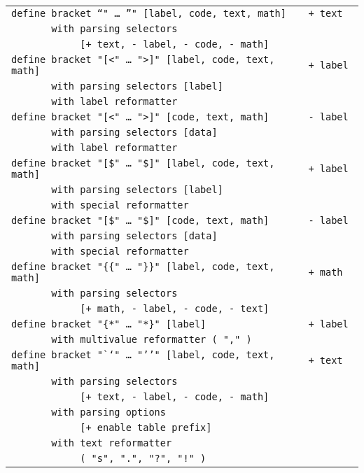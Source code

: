 \documentclass[12pt]{article}
\begin{document}
\begin{center}
\begin{tabular}{l@{\hspace*{0.2in}}l}
\tt define bracket "`" \ldots~"'" [label, code, text, math]
						              & \tt + text \\
\tt ~~~~~~~with parsing selectors \\
\tt ~~~~~~~~~~~~[+ text, - label, - code, - math] \\
\tt define bracket "[<" \ldots~">]" [label, code, text, math] & \tt + label \\
\tt ~~~~~~~with parsing selectors [label] \\
\tt ~~~~~~~with label reformatter \\
\tt define bracket "[<" \ldots~">]" [code, text, math]	      & \tt - label \\
\tt ~~~~~~~with parsing selectors [data] \\
\tt ~~~~~~~with label reformatter \\
\tt define bracket "[\$" \ldots~"\$]" [label, code, text, math]
                                                              & \tt + label \\
\tt ~~~~~~~with parsing selectors [label] \\
\tt ~~~~~~~with special reformatter \\
\tt define bracket "[\$" \ldots~"\$]" [code, text, math]
                                                              & \tt - label \\
\tt ~~~~~~~with parsing selectors [data] \\
\tt ~~~~~~~with special reformatter \\
\tt define bracket "\{\{" \ldots~"\}\}" [label, code, text, math]
                                                              & \tt + math \\
\tt ~~~~~~~with parsing selectors \\
\tt ~~~~~~~~~~~~[+ math, - label, - code, - text] \\
\tt define bracket "\{*" \ldots~"*\}" [label]		& \tt + label \\
\tt ~~~~~~~with multivalue reformatter ( "," ) \\
\tt define bracket "`{}`" \ldots~"'{}'" [label, code, text, math]
							     & \tt + text \\
\tt ~~~~~~~with parsing selectors \\
\tt ~~~~~~~~~~~~[+ text, - label, - code, - math] \\
\tt ~~~~~~~with parsing options \\
\tt ~~~~~~~~~~~~[+ enable table prefix] \\
\tt ~~~~~~~with text reformatter \\
\tt ~~~~~~~~~~~~( "s", ".", "?", "!" ) \\
\end{tabular}
\end{center}
\end{document}
